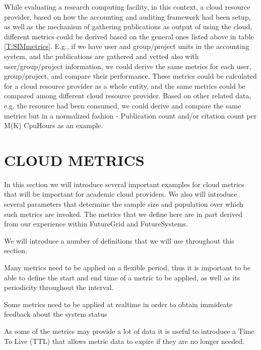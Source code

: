 \documentclass{sig-alternate-05-2015}
\begin{document}
While evaluating a research computing facility, in this context, a cloud resource 
provider, based on how the accounting and auditing framework had been setup, as well as
the mechanism of gathering publications as output of using the cloud, different metrics
could be derived based on the general ones listed above in table \ref{T:SIMmetrics}.
E.g., if we have user and group/project units in the accounting system, and the 
publications are gathered and vetted also with user/group/project information, we could
derive the same metrics for each user, group/project, and compare their performance.
These metrics could be calculated for a cloud resource provider as a whole entity, 
and the same metrics could be compared among different cloud resource provider. Based on
other related data, e.g. the resource had been consumed, we could derive and compare
the same metrics but in a normalized fashion - Publication count and/or citation count
per M(K) CpuHours as an example.


\section{CLOUD METRICS} \label{S:metrics}

In this section we will introduce several important examples for
cloud metrics that will be important for academic cloud providers. We
also will introduce several parameters that determine the sample size
and population over which such metrics are invoked. The metrics that
we define here are in part derived from our experience within
FutureGrid and FutureSystems. 

We will introduce a number of definitions that we will use throughout
this section. 

\begin{description}
\setlength\itemsep{-2pt}

\item [Period.] Many metrics need to be applied on a flexible period,
  thus it is important to be able to define the start and end time of
  a metric to be applied, as well as its periodicity throughout the
  interval.

\item[Realtime.] Some metrics need to be applied at realtime in order
  to obtain immideate feedback about the system status

\item[Time to Live.] As some of the metrics may provide a lot of data
  it is useful to introduce a Time To Live (TTL) that allows metric
  data to expire if they are no longer needed.
 
\end{description}
\end{document}

